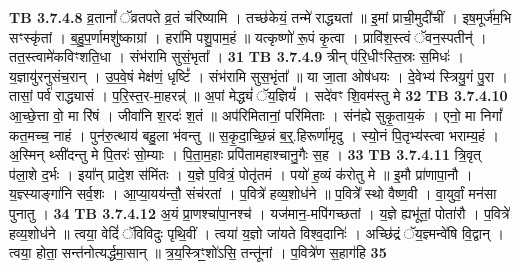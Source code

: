 \documentclass[17pt]{extarticle}
\begin{document}
{{{{{{{{{{{{{{{{{{{                  \newline
                                \textbf{ TB 3.7.4.8} \newline
                  व्र॒तानां᳚ ॅव्रतपते व्र॒तं च॑रिष्यामि । तच्छ॑केयं॒ तन्मे॑ राद्ध्यतां ॥ इ॒मां प्राची॒मुदी॑चीं । इष॒मूर्ज॑म॒भि सꣳस्कृ॑तां । ब॒हु॒प॒र्णामशु॑ष्काग्रां । हरा॑मि पशु॒पाम॒हं ॥ यत्कृष्णो॑ रू॒पं कृ॒त्वा । प्रावि॑श॒स्त्वं ॅवन॒स्पतीन्॑ । तत॒स्त्वामे॑कविꣳशति॒धा । संभ॑रामि सुसं॒भृता᳚ । \textbf{ 31} \newline
                  \newline
                                \textbf{ TB 3.7.4.9} \newline
                  त्रीन् प॑रि॒धीꣳस्ति॒स्रः स॒मिधः॑ । य॒ज्ञायु॑रनुसंच॒रान् । उ॒प॒वे॒षं मेक्ष॑णं॒ धृष्टिं᳚ । संभ॑रामि सुस॒भृंता᳚ ॥ या जा॒ता ओष॑धयः । दे॒वेभ्य॑ स्त्रियु॒गं पु॒रा । तासां॒ पर्व॑ राद्ध्यासं । प॒रि॒स्त॒र-मा॒हरन्न्॑ ॥ अ॒पां मेद्ध्यं॑ ॅय॒ज्ञियं᳚ । सदे॑वꣳ शि॒वम॑स्तु मे \textbf{ 32} \newline
                  \newline
                                \textbf{ TB 3.7.4.10} \newline
                  आ॒च्छे॒त्ता वो॒ मा रि॑षं । जीवा॑नि श॒रदः॑ श॒तं ॥ अप॑रिमितानां॒ परि॑मिताः । संन॑ह्ये सुकृ॒ताय॒कं । एनो॒ मा निगां᳚ कत॒मच्च॒ नाहं । पुन॑रु॒त्थाय॑ बहु॒ला भ॑वन्तु ॥ स॒कृ॒दा॒च्छि॒न्नं ब॒र्॒.हिरूर्णा॑मृदु । स्यो॒नं पि॒तृभ्य॑स्त्वा भराम्य॒हं । अ॒स्मिन् थ्सी॑दन्तु मे पि॒तरः॑ सो॒म्याः । पि॒ता॒म॒हाः प्रपि॑तामहाश्चानु॒गैः स॒ह । \textbf{ 33} \newline
                  \newline
                                \textbf{ TB 3.7.4.11} \newline
                  त्रि॒वृत् प॑ला॒शे द॒र्भः । इया᳚न् प्रादे॒श स॑मिंतः । य॒ज्ञे प॒वित्रं॒ पोतृ॑तमं । पयो॑ ह॒व्यं क॑रोतु मे ॥ इ॒मौ प्रा॑णापा॒नौ । य॒ज्ञ्स्याङ्गा॑नि सर्व॒शः । आ॒प्या॒यय॑न्तौ॒ संच॑रतां । प॒वित्रे॑ हव्य॒शोध॑ने ॥ प॒वित्रे᳚ स्थो वैष्ण॒वी । वा॒युर्वां॒ मन॑सा पुनातु । \textbf{ 34} \newline
                  \newline
                                \textbf{ TB 3.7.4.12} \newline
                  अ॒यं प्रा॒णश्चा॑पा॒नश्च॑ । यज॑मान॒-मपि॑गच्छतां । य॒ज्ञे ह्यभू॑तां॒ पोता॑रौ । प॒वित्रे॑ हव्य॒शोध॑ने ॥ त्वया॒ वेदिं॑ ॅविविदुः पृथि॒वीं । त्वया॑ य॒ज्ञो जा॑यते विश्व॒दानिः॑ । अच्छि॑द्रं ॅय॒ज्ञ्मन्वे॑षि वि॒द्वान् । त्वया॒ होता॒ सन्त॑नोत्यर्द्धमा॒सान् ॥ त्र॒य॒स्त्रिꣳ॒॒शो॑ऽसि॒ तन्तू॑नां । प॒वित्रे॑ण स॒हाग॑हि \textbf{ 35} \newline
}}}}}}}}}}}}}}}}}}}
\end{document}
